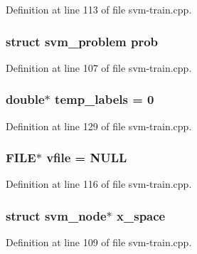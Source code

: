 Definition at line 113 of file svm-\/train.\-cpp.

\hypertarget{_2svm-train_8cpp_a3d3cd08abb1a582bcbb3095eb03ed0d6}{
\subsubsection[{prob}]{\setlength{\rightskip}{0pt plus 5cm}struct {\bf svm\-\_\-problem} prob}}\label{_2svm-train_8cpp_a3d3cd08abb1a582bcbb3095eb03ed0d6}


Definition at line 107 of file svm-\/train.\-cpp.

\hypertarget{_2svm-train_8cpp_a8d832079d5b980f5955dcd7afc689ba9}{
\subsubsection[{temp\-\_\-labels}]{\setlength{\rightskip}{0pt plus 5cm}double$\ast$ temp\-\_\-labels = 0}}\label{_2svm-train_8cpp_a8d832079d5b980f5955dcd7afc689ba9}


Definition at line 129 of file svm-\/train.\-cpp.

\hypertarget{_2svm-train_8cpp_a32ca8324fdbaa5886494c3794aabb98e}{
\subsubsection[{vfile}]{\setlength{\rightskip}{0pt plus 5cm}F\-I\-L\-E$\ast$ vfile = N\-U\-L\-L}}\label{_2svm-train_8cpp_a32ca8324fdbaa5886494c3794aabb98e}


Definition at line 116 of file svm-\/train.\-cpp.

\hypertarget{_2svm-train_8cpp_aee6e5726660b16e12499d9bfa6eef01f}{
\subsubsection[{x\-\_\-space}]{\setlength{\rightskip}{0pt plus 5cm}struct {\bf svm\-\_\-node}$\ast$ x\-\_\-space}}\label{_2svm-train_8cpp_aee6e5726660b16e12499d9bfa6eef01f}


Definition at line 109 of file svm-\/train.\-cpp.

